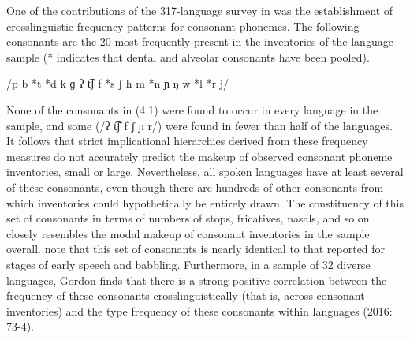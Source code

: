   One of the contributions of the 317-language survey in \citet{Maddieson1984} was the establishment of crosslinguistic frequency patterns for consonant phonemes. The following consonants are the 20 most frequently present in the inventories of the language sample (* indicates that dental and alveolar consonants have been pooled).

\ea\label{ex:(4.1)}
  /p b *t *d k ɡ ʔ t͡ʃ f *s ʃ h m *n ɲ ŋ w *l *r j/

\citep[12]{Maddieson1984}
\z

None of the consonants in (4.1) were found to occur in every language in the sample, and some (/ʔ t͡ʃ f ʃ ɲ r/) were found in fewer than half of the languages. It follows that strict implicational hierarchies derived from these frequency measures do not accurately predict the makeup of observed consonant phoneme inventories, small or large. Nevertheless, all spoken languages have at least several of these consonants, even though there are hundreds of other consonants from which inventories could hypothetically be entirely drawn. The constituency of this set of consonants in terms of numbers of stops, fricatives, nasals, and so on closely resembles the modal makeup of consonant inventories in the sample overall. \citet{LindblomMaddieson1988} note that this set of consonants is nearly identical to that reported for stages of early speech and babbling. Furthermore, in a sample of 32 diverse languages, Gordon finds that there is a strong positive correlation between the frequency of these consonants crosslinguistically (that is, across consonant inventories) and the type frequency of these consonants within languages (2016: 73-4).

